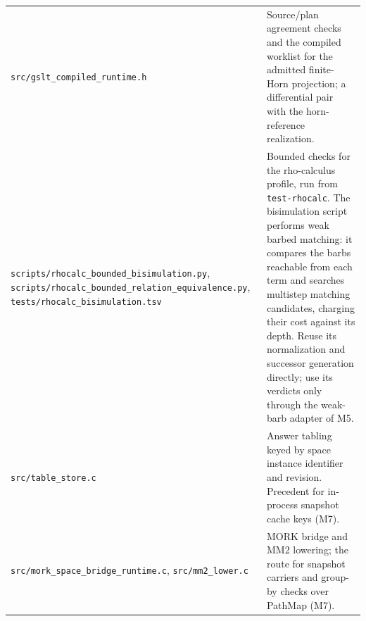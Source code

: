 \documentclass[11pt]{article}
\newcommand{\fpath}[1]{\nolinkurl{#1}}
\newcommand{\code}[1]{\texttt{#1}}
\begin{document}
\begin{longtable}{>{\raggedright\arraybackslash}p{4.6cm}>{\raggedright\arraybackslash}p{9.3cm}}
\fpath{src/gslt_compiled_runtime.h} & Source/plan agreement checks and the compiled worklist for the admitted finite-Horn projection; a differential pair with the horn-reference realization.\\
\fpath{scripts/rhocalc_bounded_bisimulation.py}, \fpath{scripts/rhocalc_bounded_relation_equivalence.py}, \fpath{tests/rhocalc_bisimulation.tsv} & Bounded checks for the rho-calculus profile, run from \code{test-rhocalc}. The bisimulation script performs weak barbed matching: it compares the barbs reachable from each term and searches multistep matching candidates, charging their cost against its depth. Reuse its normalization and successor generation directly; use its verdicts only through the weak-barb adapter of M5.\\
\fpath{src/table_store.c} & Answer tabling keyed by space instance identifier and revision. Precedent for in-process snapshot cache keys (M7).\\
\fpath{src/mork_space_bridge_runtime.c}, \fpath{src/mm2_lower.c} & MORK bridge and MM2 lowering; the route for snapshot carriers and group-by checks over PathMap (M7).\\
\bottomrule
\end{longtable}
\end{document}

